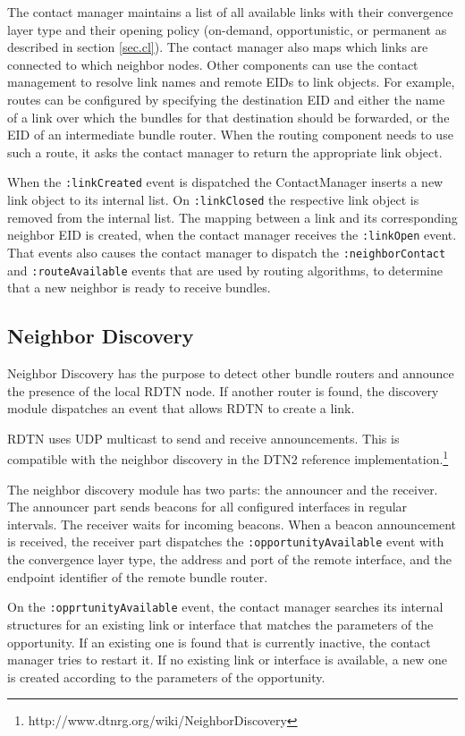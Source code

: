 \documentclass[a4paper]{article}
\begin{document}
The contact manager maintains a list of all available links with their
convergence layer type and their opening policy (on-demand, opportunistic, or
permanent as described in section \ref{sec.cl}). The contact manager also maps
which links are connected to which neighbor nodes. Other components can use the
contact management to resolve link names and remote EIDs to link objects. For
example, routes can be configured by specifying the destination EID and either
the name of a link over which the bundles for that destination should be
forwarded, or the EID of an intermediate bundle router. When the routing
component needs to use such a route, it asks the contact manager to return the
appropriate link object.

When the {\tt :linkCreated} event is dispatched the ContactManager inserts a new
link object to its internal list.  On {\tt :linkClosed} the respective link
object is removed from the internal list. The mapping between a link and its
corresponding neighbor EID is created, when the contact manager receives the
{\tt :linkOpen} event. That events also causes the contact manager to dispatch
the {\tt :neighborContact} and {\tt :routeAvailable} events that are used by
routing algorithms, to determine that a new neighbor is ready to receive
bundles.

\subsection{Neighbor Discovery}\label{sec.discovery}

Neighbor Discovery has the purpose to detect other bundle routers and announce
the presence of the local RDTN node. If another router is found, the
discovery module dispatches an event that allows RDTN to create a link.

RDTN uses UDP multicast to send and receive announcements. This is compatible
with the neighbor discovery in the DTN2 reference
implementation.\footnote{http://www.dtnrg.org/wiki/NeighborDiscovery} 

The neighbor discovery module has two parts: the announcer and the receiver. The
announcer part sends beacons for all configured interfaces in regular intervals.
The receiver waits for incoming beacons. When a beacon announcement is received,
the receiver part dispatches the {\tt :opportunityAvailable} event with the
convergence layer type, the address and port of the remote interface, and the
endpoint identifier of the remote bundle router.

On the {\tt :opprtunityAvailable} event, the contact manager searches its
internal structures for an existing link or interface that matches the
parameters of the opportunity. If an existing one is found that is currently
inactive, the contact manager tries to restart it. If no existing link or
interface is available, a new one is created according to the parameters of the
opportunity.
\end{document}
